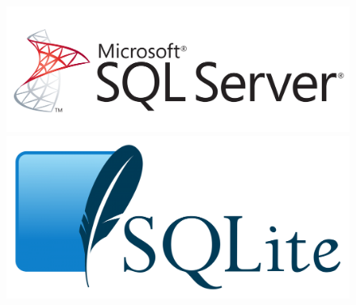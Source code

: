 \begin{frame}
\begin{columns}
\begin{column}{7cm}
\begin{figure}
\includegraphics[scale=0.052]{Images/MsSqlServer}
\includegraphics[scale=0.052]{Images/SQLite}
\end{figure}
\end{column}
\end{columns}
\end{frame}


